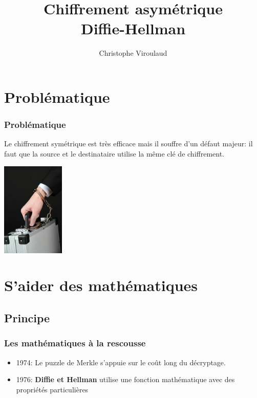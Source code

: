 \documentclass[svgnames,11pt]{beamer}
\author[]{Christophe Viroulaud}
\title{Chiffrement asymétrique\\Diffie-Hellman}
\date{}
\institute{Terminale NSI}
\begin{document}
\begin{frame}
    \titlepage
\end{frame}

\section{Problématique}
\begin{frame}
    \frametitle{Problématique}
    Le chiffrement symétrique est très efficace mais il souffre d'un défaut majeur: il faut que la source et le destinataire utilise la même clé de chiffrement.
    \begin{center}
        \centering
        \includegraphics[width=3cm]{ressources/echange.jpg}
    \end{center}
    \begin{center}
    \end{center}
\end{frame}

\section{S'aider des mathématiques}
\subsection{Principe}
\begin{frame}
    \frametitle{Les mathématiques à la rescousse}
    \begin{itemize}
        \item<1-> 1974: Le puzzle de Merkle s'appuie sur le coût long du décryptage.
        \item<2-> 1976: \textbf{Diffie et Hellman} utilise une fonction mathématique avec des propriétés particulières
    \end{itemize}


\end{frame}
\end{document}
